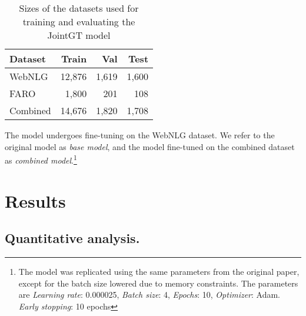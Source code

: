 \documentclass[
hf, %
]{ceurart}
\begin{document}
\begin{table}[h]
\centering
\begin{tabular}{|l|r|r|r|}
\hline
\textbf{Dataset} & \textbf{Train} & \textbf{Val} & \textbf{Test} \\ \hline
WebNLG           & 12,876          & 1,619         & 1,600          \\ \hline
FARO             & 1,800           & 201          & 108            \\ \hline
Combined         & 14,676          & 1,820         & 1,708          \\ \hline
\end{tabular}
\caption{Sizes of the datasets used for training and evaluating the JointGT model}
\label{tab:splits_dataset_jointgt}
\end{table}

The model undergoes fine-tuning on the WebNLG dataset. We refer to the original model as \textit{base model}, and the model fine-tuned on the combined dataset as \textit{combined model}.\footnote{The model was replicated using the same parameters from the original paper, except for the batch size lowered due to memory constraints. The parameters are \textit{Learning rate}: 0.000025, \textit{Batch size}: 4, \textit{Epochs}: 10, \textit{Optimizer}: Adam. \textit{Early stopping}: 10 epochs}

\section{Results}
\label{sec:results_jointGT}

\subsection{Quantitative analysis.}

\end{document}
